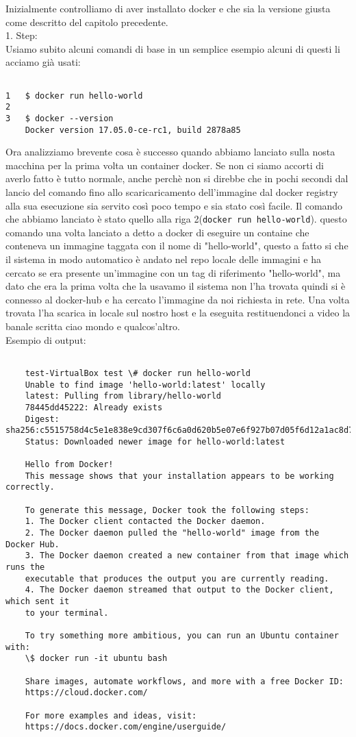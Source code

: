 Inizialmente controlliamo di aver installato docker e che sia la versione giusta come descritto del capitolo precedente.\\
1. Step:\\
Usiamo subito alcuni comandi di base in un semplice esempio alcuni di questi li acciamo già usati:
\begin{verbatim}

1	$ docker run hello-world
2	
3	$ docker --version
	Docker version 17.05.0-ce-rc1, build 2878a85

\end{verbatim}
Ora analizziamo brevente cosa è successo quando abbiamo lanciato sulla nosta macchina per la prima volta un container docker.
Se non ci siamo accorti di averlo fatto è tutto normale, anche perchè non si direbbe che in pochi secondi dal lancio del comando fino allo scaricaricamento dell'immagine dal docker registry alla sua esecuzione sia servito così poco tempo e sia stato così facile.
Il comando che abbiamo lanciato è stato quello alla riga 2(\texttt{docker run hello-world}).
questo comando una volta lanciato a detto a docker di eseguire un containe che conteneva un immagine taggata con il nome di "hello-world", questo a fatto si che il sistema in modo automatico è andato nel repo locale delle immagini e ha cercato se era presente un'immagine con un tag di riferimento "hello-world", ma dato che era la prima volta che la usavamo il sistema non l'ha trovata quindi si è connesso al docker-hub e ha cercato l'immagine da noi richiesta in rete. Una volta trovata l'ha scarica in locale sul nostro host e la eseguita restituendonci a video la banale scritta ciao mondo e qualcos'altro.\\
Esempio di output:
\begin{verbatim}

	test-VirtualBox test \# docker run hello-world
	Unable to find image 'hello-world:latest' locally
	latest: Pulling from library/hello-world
	78445dd45222: Already exists 
	Digest: sha256:c5515758d4c5e1e838e9cd307f6c6a0d620b5e07e6f927b07d05f6d12a1ac8d7
	Status: Downloaded newer image for hello-world:latest
	
	Hello from Docker!
	This message shows that your installation appears to be working correctly.
	
	To generate this message, Docker took the following steps:
	1. The Docker client contacted the Docker daemon.
	2. The Docker daemon pulled the "hello-world" image from the Docker Hub.
	3. The Docker daemon created a new container from that image which runs the
	executable that produces the output you are currently reading.
	4. The Docker daemon streamed that output to the Docker client, which sent it
	to your terminal.
	
	To try something more ambitious, you can run an Ubuntu container with:
	\$ docker run -it ubuntu bash
	
	Share images, automate workflows, and more with a free Docker ID:
	https://cloud.docker.com/
	
	For more examples and ideas, visit:
	https://docs.docker.com/engine/userguide/

\end{verbatim}
